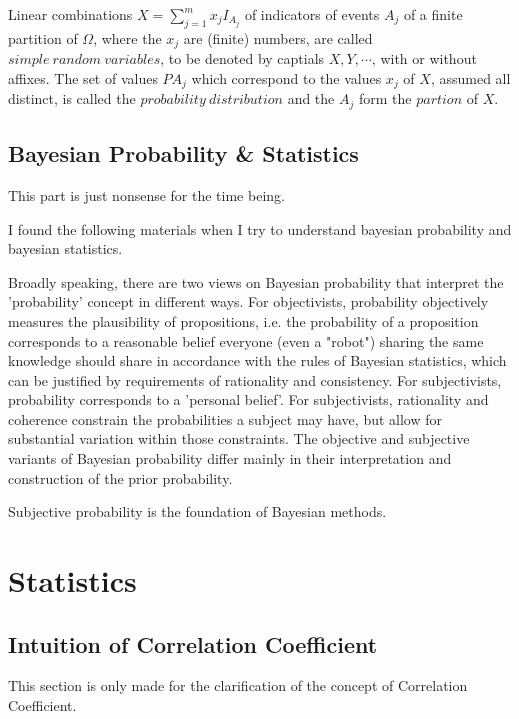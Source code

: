 \documentclass[a4paper]{book}
\begin{document}
	Linear combinations $X = \sum\limits^{m}_{j=1}x_jI_{A_j}$ of
	indicators of events $A_j$ of a finite partition of $\Omega$, where
	the $x_j$ are (finite) numbers, are called $simple\ random\
	variables$, to be denoted by captials $X, Y, \cdots$, with or without
	affixes. The set of values $PA_j$ which correspond to the values $x_j$
	of $X$, assumed all distinct, is called the $probability\
	distribution$ and the $A_j$ form the $partion$ of
	$X$.\cite{1977probability}

\section{Bayesian Probability \& Statistics}

	This part is just nonsense for the time being.

	I found the following materials when I try to understand bayesian
	probability and bayesian statistics.

	Broadly speaking, there are two views on Bayesian probability that
	interpret the 'probability' concept in different ways. For objectivists,
	probability objectively measures the plausibility of propositions, i.e.
	the probability of a proposition corresponds to a reasonable belief
	everyone (even a "robot") sharing the same knowledge should share in
	accordance with the rules of Bayesian statistics, which can be justified
	by requirements of rationality and consistency. For subjectivists,
	probability corresponds to a 'personal belief'. For subjectivists,
	rationality and coherence constrain the probabilities a subject may
	have, but allow for substantial variation within those constraints. The
	objective and subjective variants of Bayesian probability differ mainly
	in their interpretation and construction of the prior
	probability.\cite{wiki_bayesian_probability}

	Subjective probability is the foundation of Bayesian methods.
	\cite{hogg2012introduction}

\chapter{Statistics}

\section{Intuition of Correlation Coefficient}
	This section is only made for the clarification of the concept of
	Correlation Coefficient.
\end{document}
